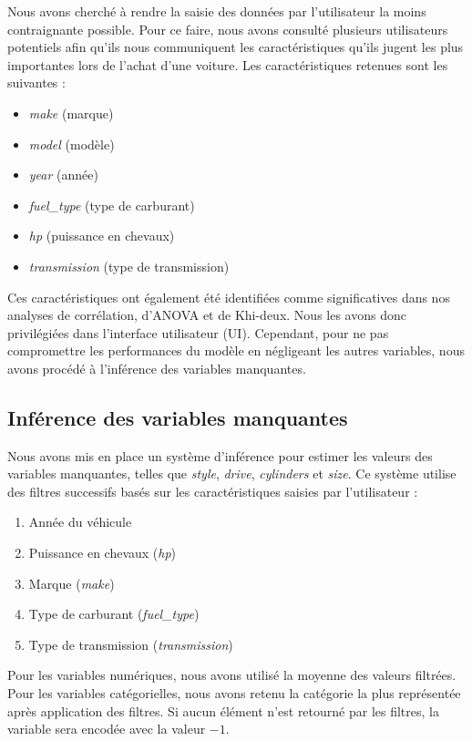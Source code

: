 \documentclass[12pt]{report}
\begin{document}
Nous avons cherché à rendre la saisie des données par l'utilisateur la moins contraignante possible. Pour ce faire, nous avons consulté plusieurs utilisateurs potentiels afin qu'ils nous communiquent les caractéristiques qu'ils jugent les plus importantes lors de l'achat d'une voiture. Les caractéristiques retenues sont les suivantes :
\begin{itemize}
    \item \textit{make} (marque)
    \item \textit{model} (modèle)
    \item \textit{year} (année)
    \item \textit{fuel\_type} (type de carburant)
    \item \textit{hp} (puissance en chevaux)
    \item \textit{transmission} (type de transmission)
\end{itemize}

Ces caractéristiques ont également été identifiées comme significatives dans nos analyses de corrélation, d'ANOVA et de Khi-deux. Nous les avons donc privilégiées dans l'interface utilisateur (UI). Cependant, pour ne pas compromettre les performances du modèle en négligeant les autres variables, nous avons procédé à l'inférence des variables manquantes.

\subsection{Inférence des variables manquantes}

Nous avons mis en place un système d'inférence pour estimer les valeurs des variables manquantes, telles que \textit{style}, \textit{drive}, \textit{cylinders} et \textit{size}. Ce système utilise des filtres successifs basés sur les caractéristiques saisies par l'utilisateur :
\begin{enumerate}
    \item Année du véhicule
    \item Puissance en chevaux (\textit{hp})
    \item Marque (\textit{make})
    \item Type de carburant (\textit{fuel\_type})
    \item Type de transmission (\textit{transmission})
\end{enumerate}

Pour les variables numériques, nous avons utilisé la moyenne des valeurs filtrées. Pour les variables catégorielles, nous avons retenu la catégorie la plus représentée après application des filtres. Si aucun élément n'est retourné par les filtres, la variable sera encodée avec la valeur \(-1\).
\end{document}
